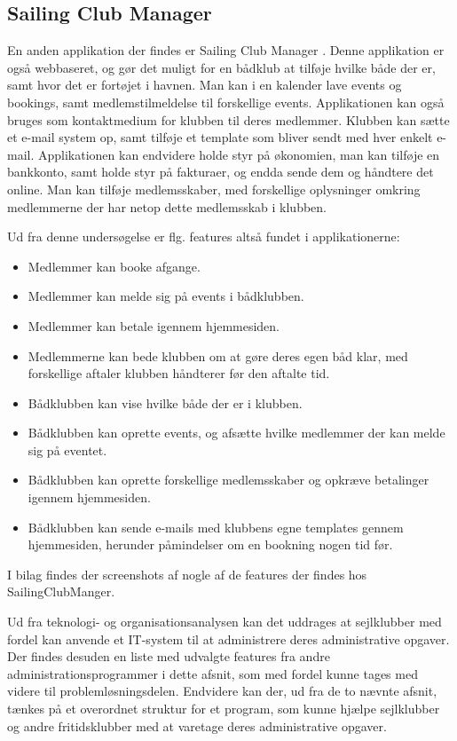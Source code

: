 \subsection*{Sailing Club Manager}
En anden applikation der findes er Sailing Club Manager \citep{SailClub}. Denne applikation er også
webbaseret, og gør det muligt for en bådklub at tilføje hvilke både der er, samt hvor det er fortøjet i
havnen. Man kan i en kalender lave events og bookings, samt medlemstilmeldelse til forskellige events. Applikationen kan også bruges som kontaktmedium for klubben til deres medlemmer. Klubben kan sætte et
e-mail system op, samt tilføje et template som bliver sendt med hver enkelt e-mail. Applikationen kan endvidere
holde styr på økonomien, man kan tilføje en bankkonto, samt  holde styr på fakturaer, og endda sende
dem og håndtere det online. Man kan tilføje medlemsskaber, med forskellige oplysninger omkring medlemmerne der
har netop dette medlemsskab i klubben.

Ud fra denne undersøgelse er flg. features altså fundet i applikationerne:

\begin{itemize}
	\item Medlemmer kan booke afgange.
	\item Medlemmer kan melde sig på events i bådklubben.
	\item Medlemmer kan betale igennem hjemmesiden.
	\item Medlemmerne kan bede klubben om at gøre deres egen båd klar, med forskellige aftaler klubben håndterer
        før den aftalte tid.
	\item Bådklubben kan vise hvilke både der er i klubben.
	\item Bådklubben kan oprette events, og afsætte hvilke medlemmer der kan melde sig på eventet.
	\item Bådklubben kan oprette forskellige medlemsskaber og opkræve betalinger igennem hjemmesiden.
	\item Bådklubben kan sende e-mails med klubbens egne templates gennem hjemmesiden, herunder påmindelser om en
        bookning nogen tid før.
\end{itemize}

I bilag  findes der screenshots af nogle af de features der findes hos SailingClubManger.

Ud fra teknologi- og organisationsanalysen kan det uddrages at sejlklubber med fordel kan anvende et IT-system til at administrere deres administrative opgaver. Der findes desuden en liste med udvalgte features fra andre administrationsprogrammer i dette afsnit, som med fordel kunne tages med videre til problemløsningsdelen. 
Endvidere kan der, ud fra de to nævnte afsnit, tænkes på et overordnet struktur for et program, som kunne hjælpe sejlklubber og andre fritidsklubber med at varetage deres administrative opgaver.  
